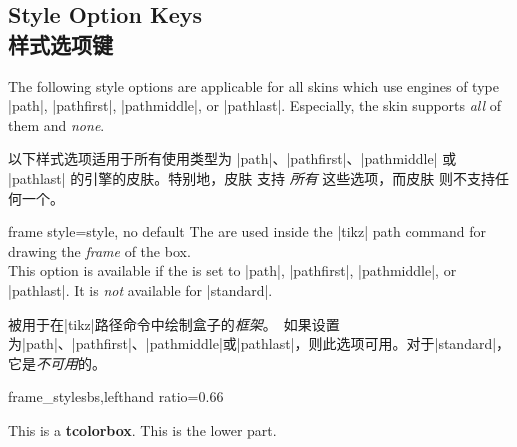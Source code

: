 
\setcounter{section}{10}
\setcounter{subsection}{0}
\setcounter{subsubsection}{0} 
\subsection{Style Option Keys\\样式选项键}\label{subsec:addstyleoptions}

The following style options are applicable for all skins which
use engines of type |path|, |pathfirst|, |pathmiddle|, or |pathlast|.
Especially, the skin  supports \emph{all} of them
and  \emph{none}.

以下样式选项适用于所有使用类型为 |path|、|pathfirst|、|pathmiddle| 或 |pathlast| 的引擎的皮肤。特别地，皮肤  支持 \emph{所有} 这些选项，而皮肤  则不支持任何一个。


\begin{docTcbKey}{frame style}{=}{style, no default}
The  are used inside the |tikz| path command
for drawing the \emph{frame} of the box.\\
This option is available if the  is set to
|path|, |pathfirst|, |pathmiddle|, or |pathlast|.
It is \emph{not} available for |standard|.

被用于在|tikz|路径命令中绘制盒子的\emph{框架}。\ 如果设置为|path|、|pathfirst|、|pathmiddle|或|pathlast|，则此选项可用。对于|standard|，它是\emph{不可用}的。
\begin{exdispExample*}{frame_style}{sbs,lefthand ratio=0.66}

\begin{tcolorbox}[enhanced,title=My title,
frame style={left color=red!75!black,
              right color=blue!75!black}]
This is a \textbf{tcolorbox}.
\tcblower
This is the lower part.
\end{tcolorbox}
\end{exdispExample*}
\end{docTcbKey}

